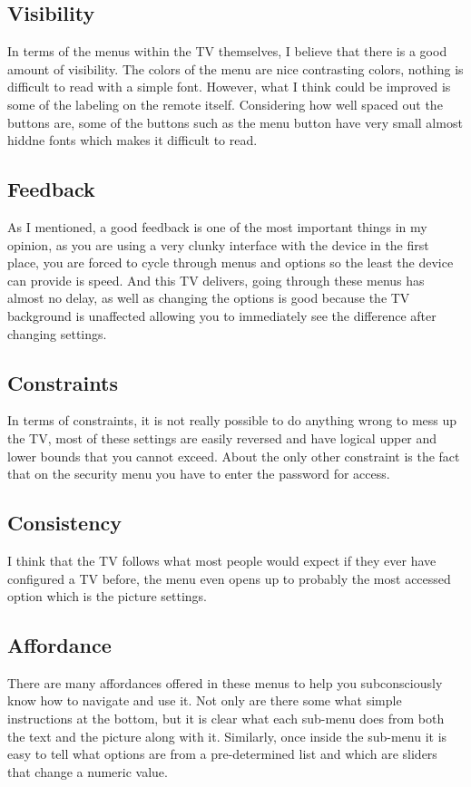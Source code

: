 \documentclass[a4paper, 11pt]{article}
\begin{document}
\subsection*{Visibility}
In terms of the menus within the TV themselves, I believe that there is a good amount of visibility.  The colors of the menu are nice contrasting colors, nothing is difficult to read with a simple font. However, what I think could be improved is some of the labeling on the remote itself.  Considering how well spaced out the buttons are, some of the buttons such as the menu button have very small almost hiddne fonts which makes it difficult to read.

\subsection*{Feedback}
As I mentioned, a good feedback is one of the most important things in my opinion, as you are using a very clunky interface with the device in the first place, you are forced to cycle through menus and options so the least the device can provide is speed.  And this TV delivers, going through these menus has almost no delay, as well as changing the options is good because the TV background is unaffected allowing you to immediately see the difference after changing settings.

\subsection*{Constraints}
In terms of constraints, it is not really possible to do anything wrong to mess up the TV, most of these settings are easily reversed and have logical upper and lower bounds that you cannot exceed.  About the only other constraint is the fact that on the security menu you have to enter the password for access.

\subsection*{Consistency}
I think that the TV follows what most people would expect if they ever have configured a TV before, the menu even opens up to probably the most accessed option which is the picture settings.

\subsection*{Affordance}
There are many affordances offered in these menus to help you subconsciously know how to navigate and use it.  Not only are there some what simple instructions at the bottom, but it is clear what each sub-menu does from both the text and the picture along with it.  Similarly, once inside the sub-menu it is easy to tell what options are from a pre-determined list and which are sliders that change a numeric value.
\end{document}
